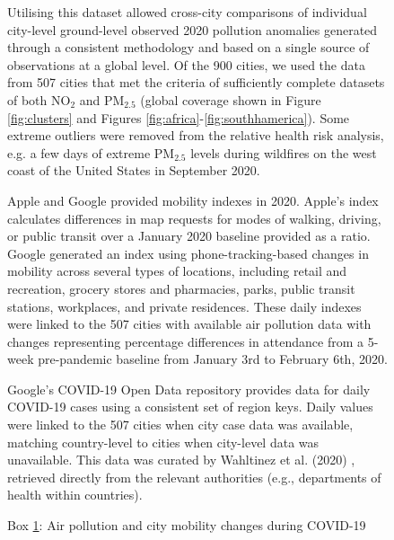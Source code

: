 \documentclass[preprint,10pt]{elsarticle} %
\begin{document}
\begin{figure}
{{Utilising this dataset allowed cross-city comparisons of individual city-level ground-level observed 2020 pollution anomalies generated through a consistent methodology and based on a single source of observations at a global level. Of the 900 cities, we used the data from 507 cities that met the criteria of sufficiently complete datasets of both NO$_{2}$ and PM$_{2.5}$ (global coverage shown in Figure \ref{fig:clusters} and Figures \ref{fig:africa}-\ref{fig:southhamerica}). Some extreme outliers were removed from the relative health risk analysis, e.g. a few days of extreme PM$_{2.5}$ levels during wildfires on the west coast of the United States in September 2020. 

Apple\cite{Apple2020} and Google\cite{Google2020} provided mobility indexes in 2020. Apple's index calculates differences in map requests for modes of walking, driving, or public transit over a January 2020 baseline provided as a ratio. Google generated an index using phone-tracking-based changes in mobility across several types of locations, including retail and recreation, grocery stores and pharmacies, parks, public transit stations, workplaces, and private residences. These daily indexes were linked to the 507 cities with available air pollution data with changes representing percentage differences in attendance from a 5-week pre-pandemic baseline from January 3rd to February 6th, 2020\cite{owidcoronavirus}.

Google's COVID-19 Open Data repository\cite{Google2022} provides data for daily COVID-19 cases using a consistent set of region keys. Daily values were linked to the 507 cities when city case data was available, matching country-level to cities when city-level data was unavailable. This data was curated by Wahltinez et al. (2020) \citep{Wahltinez2020}, retrieved directly from the relevant authorities (e.g., departments of health within countries).

}}
\captionsetup{labelformat=empty}
\caption{Box \ref{box:pollution}: Air pollution and city mobility changes during COVID-19}\label{box:pollution}
\end{figure}
\end{document}
